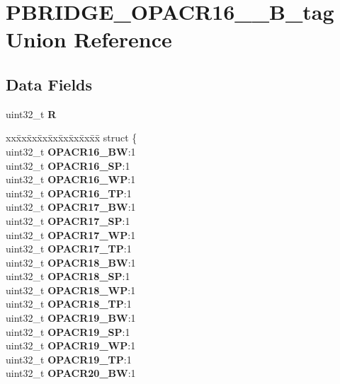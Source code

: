 \hypertarget{unionPBRIDGE__OPACR16__23__32B__tag}{}\section{P\+B\+R\+I\+D\+G\+E\+\_\+\+O\+P\+A\+C\+R16\+\_\+\_\+B\+\_\+tag Union Reference}
\label{unionPBRIDGE__OPACR16__23__32B__tag}
\subsection*{Data Fields}
\begin{DoxyCompactItemize}
\item 
\mbox{\label{unionPBRIDGE__OPACR16__23__32B__tag_a72837c266d909406bab6073b76de0a44}} 
uint32\+\_\+t {\bfseries R}
\item 
\mbox{\label{unionPBRIDGE__OPACR16__23__32B__tag_a2cf3fe1f5c6c78a57f6366b33366a358}} 
\begin{tabbing}
xx\=xx\=xx\=xx\=xx\=xx\=xx\=xx\=xx\=\kill
struct \{\\
\>uint32\_t {\bfseries OPACR16\_BW}:1\\
\>uint32\_t {\bfseries OPACR16\_SP}:1\\
\>uint32\_t {\bfseries OPACR16\_WP}:1\\
\>uint32\_t {\bfseries OPACR16\_TP}:1\\
\>uint32\_t {\bfseries OPACR17\_BW}:1\\
\>uint32\_t {\bfseries OPACR17\_SP}:1\\
\>uint32\_t {\bfseries OPACR17\_WP}:1\\
\>uint32\_t {\bfseries OPACR17\_TP}:1\\
\>uint32\_t {\bfseries OPACR18\_BW}:1\\
\>uint32\_t {\bfseries OPACR18\_SP}:1\\
\>uint32\_t {\bfseries OPACR18\_WP}:1\\
\>uint32\_t {\bfseries OPACR18\_TP}:1\\
\>uint32\_t {\bfseries OPACR19\_BW}:1\\
\>uint32\_t {\bfseries OPACR19\_SP}:1\\
\>uint32\_t {\bfseries OPACR19\_WP}:1\\
\>uint32\_t {\bfseries OPACR19\_TP}:1\\
\>uint32\_t {\bfseries OPACR20\_BW}:1\\

\end{tabbing}
\end{DoxyCompactItemize}
